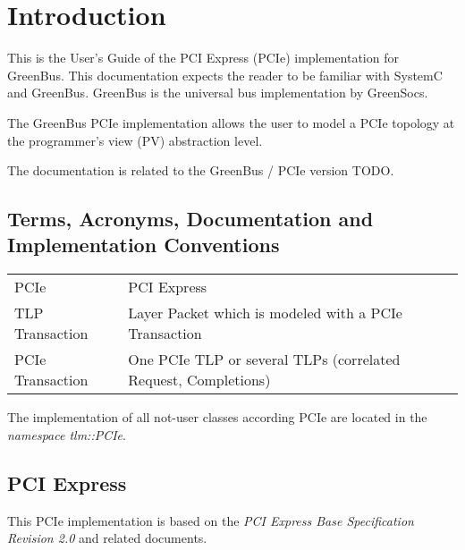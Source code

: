 
\chapter{Introduction}

This is the User's Guide of the PCI Express (PCIe) implementation for GreenBus. This documentation expects the reader to be familiar with SystemC and GreenBus. GreenBus is the universal bus implementation by GreenSocs. 

The GreenBus PCIe implementation allows the user to model a PCIe topology at the programmer's view (PV) abstraction level.

The documentation is related to the GreenBus / PCIe version TODO.

\section{Terms, Acronyms, Documentation and Implementation Conventions}

\begin{tabular}{l l}
  \textsf{PCIe} & PCI Express \\
  \textsf{TLP} Transaction & Layer Packet which is modeled with a PCIe Transaction \\
  \textsf{PCIe Transaction} & One PCIe TLP or several TLPs (correlated Request, Completions) \\
\end{tabular}

The implementation of all not-user classes according PCIe are located in the \emph{namespace tlm::PCIe}.


\section{PCI Express}

This PCIe implementation is based on the \emph{PCI Express Base Specification Revision 2.0} and related documents.

